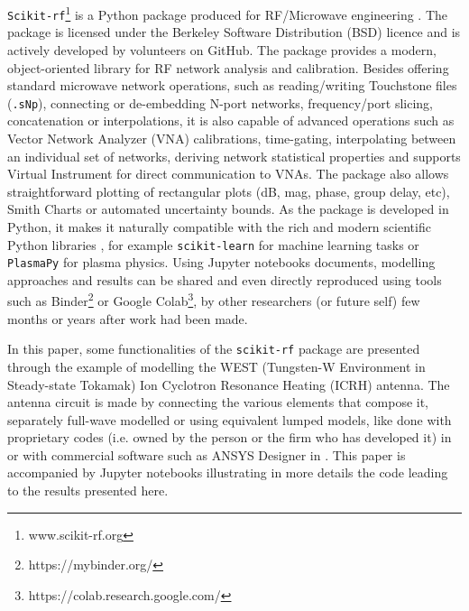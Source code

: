 \documentclass[%
aip,
cp,  %
amsmath,amssymb,%
reprint,%
]{revtex4-2}
\begin{document}
	\texttt{Scikit-rf}\footnote{www.scikit-rf.org} is a Python package produced for RF/Microwave engineering  \cite{Arsenovic2018}. The package is licensed under the Berkeley Software Distribution (BSD) licence and is actively developed by volunteers on GitHub. The package provides a modern, object-oriented library for RF network analysis and calibration. Besides offering standard microwave network operations, such as reading/writing Touchstone files (\texttt{.sNp}), connecting or de-embedding N-port networks, frequency/port slicing, concatenation or interpolations, it is also capable of advanced operations such as Vector Network Analyzer (VNA) calibrations, time-gating, interpolating between an individual set of networks, deriving network statistical properties and supports Virtual Instrument for direct communication to VNAs. The package also allows straightforward plotting of rectangular plots (dB, mag, phase, group delay, etc), Smith Charts or automated uncertainty bounds. As the package is developed in Python, it makes it naturally compatible with the rich and modern scientific Python libraries \cite{Millman2011}, for example  \texttt{scikit-learn} for machine learning tasks \cite{scikit-learn} or \texttt{PlasmaPy} \cite{PlasmaPyCommunity2018} for plasma physics. Using Jupyter notebooks documents\cite{Kluyver2016}, modelling approaches and results can be shared and even directly reproduced using tools such as Binder\footnote{https://mybinder.org/}\cite{project_jupyter-proc-scipy-2018} or Google Colab\footnote{https://colab.research.google.com/}, by other researchers (or future self) few months or years after work had been made.
	
	In this paper, some functionalities of the \texttt{scikit-rf} package are presented through the example of modelling the WEST (Tungsten-W Environment in Steady-state Tokamak) Ion Cyclotron Resonance Heating (ICRH) antenna. The antenna circuit is made by connecting the various elements that compose it, separately full-wave modelled or using equivalent lumped models, like done with proprietary codes (i.e. owned by the person or the firm who has developed it)  in \cite{Durodie2015, Helou2015_SIDON} or with commercial software such as ANSYS Designer in \cite{Hillairet2015}. This paper is accompanied by Jupyter notebooks illustrating in more details the code leading to the results presented here\cite{Hillairet2019_zenodo}.
	
	
\end{document}
